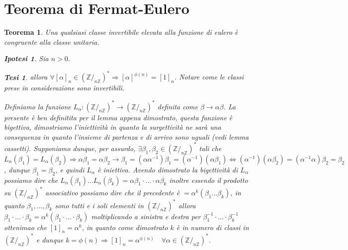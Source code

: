 \documentclass{article}
\makeatletter
\renewenvironment{proof}[1][\proofname]{\par
    \pushQED{\qed}%
    \normalfont \topsep6\p@\@plus6\p@\relax
    \trivlist
    \item\relax
    {\itshape
    #1\@addpunct{.}}\hspace\labelsep\ignorespaces
    }{%
    \popQED\endtrivlist\@endpefalse
}
\newtheorem{theorem}{Teorema}[part]
\newtheorem{ipothesis}[lemma]{Ipotesi}
\newtheorem{thesis}[lemma]{Tesi}
\theoremstyle{definition}
\newcommand{\Z}{\mathbb{Z}}
\makeatother
\begin{document}
    \section{Teorema di Fermat-Eulero}
        \begin{theorem}
            Una qualsiasi classe invertibile elevata alla funzione di eulero è congruente alla classe unitaria.
            \begin{ipothesis}
                Sia \(n>0\).
            \end{ipothesis}
            \begin{thesis}
                allora \(\forall[\alpha]_n\in(\Z/_{n\Z})^*\Rightarrow[\alpha]^{\phi(n)}=[1]_n\).
                Notare come le classi prese in considerazione sono invertibili.
            \end{thesis}
            \begin{proof}
                Definiamo la funzione \(L_\alpha:(\Z/_{n\Z})^*\rightarrow(\Z/_{n\Z})^*\) definita come \(\beta\rightarrow\alpha\beta\). La presente è ben definitita per il lemma appena dimostrato, questa funzione è bigettiva, dimostriamo l'iniettività in quanto la surgettività ne sarà una conseguenza in quanto l'insieme di partenza e di arrivo sono uguali (vedi lemma cassetti).
                Supponiamo dunque, per assurdo, \(\exists \beta_1,\beta_2\in (\Z/_{n\Z})^*\) tali che \(L_\alpha(\beta_1)=L_\alpha(\beta_2)\Rightarrow \alpha\beta_1=\alpha\beta_2\rightarrow \beta_1=(\alpha\alpha^{-1})\beta_1=(\alpha^{-1})(\alpha\beta_1)\Leftrightarrow (\alpha^{-1})(\alpha\beta_2)=(\alpha^{-1}\alpha)\beta_2=\beta_2\), dunque \(\beta_1=\beta_2\), e quindi \(L_\alpha\) è iniettiva.
                Avendo dimostrato la bigettività di \(L_\alpha\) possiamo dire che \(L_\alpha(\beta_1)\ldots L_\alpha(\beta_k)=\alpha\beta_1\cdot\ldots\cdot\alpha\beta_k\) inoltre essendo il prodotto su \((\Z/_{n\Z})^*\) associativo possiamo dire che il precedente è \(=\alpha^k(\beta_1\ldots\beta_k)\), in quanto \(\beta_1,\ldots,\beta_k\) sono tutti e i soli elementi in \((\Z/_{n\Z})^*\) allora \(\beta_1\cdot\ldots\cdot\beta_k=\alpha^k(\beta_1\cdot\ldots\cdot\beta_k)\) moltiplicando a sinistra e destra per \(\beta_1^{-1}\cdot\ldots\cdot\beta_k^{-1}\) ottenimao che \([1]_n=\alpha^k\), in quanto come dimostrato \(k\) è in numero di classi in \((\Z/_{n\Z})^*\) e dunque \(k=\phi(n)\Rightarrow [1]_n=\alpha^{\phi(n)}\quad \forall\alpha\in(\Z/_{n\Z})^*\).
                \pushQED{}
            \end{proof}
            \raggedleft{{\ensuremath{\blacksquare}}}
        \end{theorem}
\end{document}
